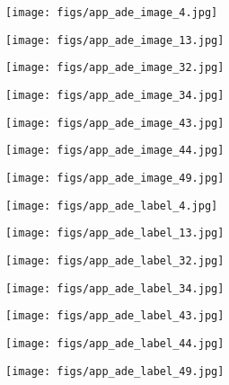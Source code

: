\documentclass[10pt,twocolumn,letterpaper]{article}
\begin{document}
\begin{figure}[!t]
\centering
    \begin{subfigure}{0.12\linewidth}
        \centering
        \texttt{[image: figs/app\_ade\_image\_4.jpg]}
\end{subfigure}
    \begin{subfigure}{0.12\linewidth}
        \centering
        \texttt{[image: figs/app\_ade\_image\_13.jpg]}
\end{subfigure}
    \begin{subfigure}{0.12\linewidth}
        \centering
        \texttt{[image: figs/app\_ade\_image\_32.jpg]}
\end{subfigure}
    \begin{subfigure}{0.15\linewidth}
        \centering
        \texttt{[image: figs/app\_ade\_image\_34.jpg]}
\end{subfigure}
    \begin{subfigure}{0.135\linewidth}
        \centering
        \texttt{[image: figs/app\_ade\_image\_43.jpg]}
\end{subfigure}
    \begin{subfigure}{0.12\linewidth}
        \centering
        \texttt{[image: figs/app\_ade\_image\_44.jpg]}
\end{subfigure}
    \begin{subfigure}{0.16\linewidth}
        \centering
        \texttt{[image: figs/app\_ade\_image\_49.jpg]}
\end{subfigure}

    \begin{subfigure}{0.12\linewidth}
        \centering
        \texttt{[image: figs/app\_ade\_label\_4.jpg]}
\end{subfigure}
    \begin{subfigure}{0.12\linewidth}
        \centering
        \texttt{[image: figs/app\_ade\_label\_13.jpg]}
\end{subfigure}
    \begin{subfigure}{0.12\linewidth}
        \centering
        \texttt{[image: figs/app\_ade\_label\_32.jpg]}
\end{subfigure}
    \begin{subfigure}{0.15\linewidth}
        \centering
        \texttt{[image: figs/app\_ade\_label\_34.jpg]}
\end{subfigure}
    \begin{subfigure}{0.135\linewidth}
        \centering
        \texttt{[image: figs/app\_ade\_label\_43.jpg]}
\end{subfigure}
    \begin{subfigure}{0.12\linewidth}
        \centering
        \texttt{[image: figs/app\_ade\_label\_44.jpg]}
\end{subfigure}
    \begin{subfigure}{0.16\linewidth}
        \centering
        \texttt{[image: figs/app\_ade\_label\_49.jpg]}
\end{subfigure}


\end{figure}
\end{document}
